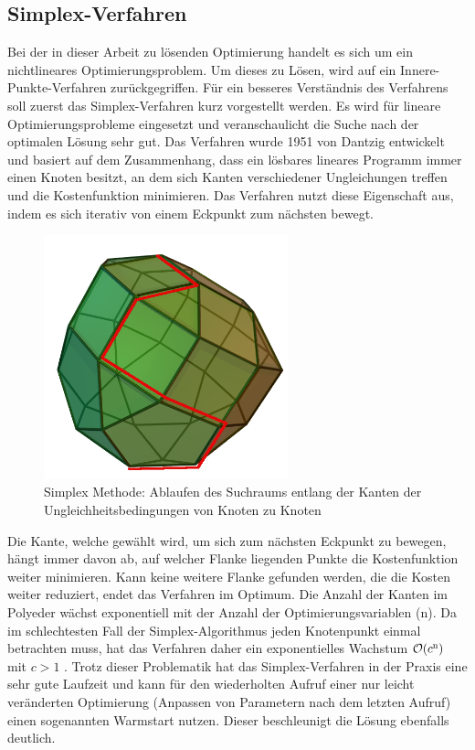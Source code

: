 \documentclass{like}
\begin{document}
\subsection{Simplex-Verfahren}
Bei der in dieser Arbeit zu lösenden Optimierung handelt es sich um ein nichtlineares Optimierungsproblem. Um dieses zu Lösen, wird auf ein Innere-Punkte-Verfahren zurückgegriffen. Für ein besseres Verständnis des Verfahrens soll zuerst das Simplex-Verfahren kurz vorgestellt werden. Es wird für lineare Optimierungsprobleme eingesetzt und veranschaulicht die Suche nach der optimalen Lösung sehr gut. Das Verfahren wurde 1951 von Dantzig \cite{dantzig51} entwickelt und basiert auf dem Zusammenhang, dass ein lösbares lineares Programm immer einen Knoten besitzt, an dem sich Kanten verschiedener Ungleichungen treffen und die Kostenfunktion minimieren. Das Verfahren nutzt diese Eigenschaft aus, indem es sich iterativ von einem Eckpunkt zum nächsten bewegt. 
\begin{figure}[ht!]
	\centering
	\includegraphics[width=200pt]{Abbildungen/simplexMethod.png}
	\caption{Simplex Methode: Ablaufen des Suchraums entlang der Kanten der Ungleichheitsbedingungen von Knoten zu Knoten}
	\label{fig:splxMethod}
\end{figure}

Die Kante, welche gewählt wird, um sich zum nächsten Eckpunkt zu bewegen, hängt immer davon ab, auf welcher Flanke liegenden Punkte die Kostenfunktion weiter minimieren. Kann keine weitere Flanke gefunden werden, die die Kosten weiter reduziert, endet das Verfahren im Optimum. Die Anzahl der Kanten im Polyeder wächst exponentiell mit der Anzahl der Optimierungsvariablen (n). Da im schlechtesten Fall der Simplex-Algorithmus jeden Knotenpunkt einmal betrachten muss, hat das Verfahren daher ein exponentielles Wachstum $\mathcal{O}(c\textsuperscript{n})$ mit $c>1$ \cite{doi:10.1137/S0036144502414942}. Trotz dieser Problematik hat das Simplex-Verfahren in der Praxis eine sehr gute Laufzeit und kann für den wiederholten Aufruf einer nur leicht veränderten Optimierung (Anpassen von Parametern nach dem letzten Aufruf) einen sogenannten Warmstart nutzen. Dieser beschleunigt die Lösung ebenfalls deutlich.\\
\end{document}
